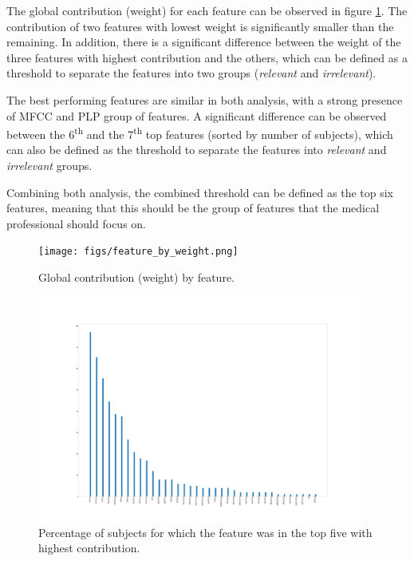 The global contribution (weight) for each feature can be observed in figure \ref{weight}. The contribution of two features with lowest weight is significantly smaller than the remaining. In addition, there is a significant difference between the weight of the three features with highest contribution and the others, which can be defined as a threshold to separate the features into two groups (\textit{relevant} and \textit{irrelevant}).

The best performing features are similar in both analysis, with a strong presence of MFCC and PLP group of features. A significant difference can be observed between the 6\textsuperscript{th} and the 7\textsuperscript{th} top features (sorted by number of subjects), which can also be defined as the threshold to separate the features into \textit{relevant} and \textit{irrelevant} groups.

Combining both analysis, the combined threshold can be defined as the top six features, meaning that this should be the group of features that the medical professional should focus on.

	\begin{figure}[t]
		\begin{center}
			\texttt{[image: figs/feature\_by\_weight.png]}
		\end{center}
		\caption{Global contribution (weight) by feature.}
		\label{weight}
	\end{figure}


	\begin{figure}[t]
		\begin{center}
			\includegraphics[clip=false,height=0.95\textwidth,width=0.95\textwidth]{figs/feature_by_percentage.png}
		\end{center}
		\caption{Percentage of subjects for which the feature was in the top five with highest contribution.}
		\label{percentage}
	\end{figure}

